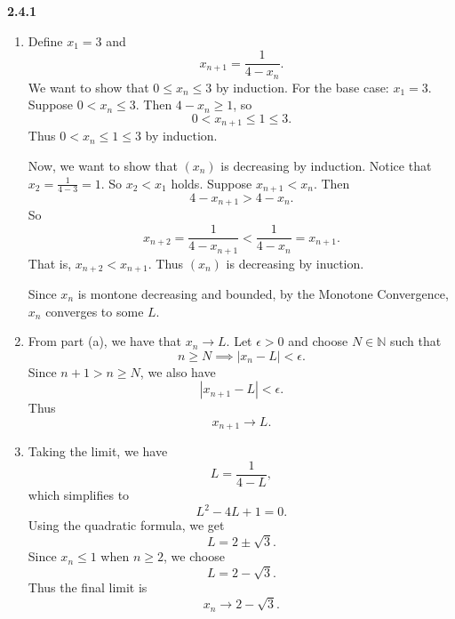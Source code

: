 \documentclass[12pt]{article}
\begin{document}
\textbf{2.4.1}
\begin{enumerate}[label=(\alph*)]
    \item Define \( x_1 = 3 \) and
          \[
              x_{n+1} = \frac{1}{4-x_n}.
          \]
          We want to show that \( 0 \leq x_n \leq 3 \) by induction.
          For the base case: \( x_1 = 3 \). Suppose \( 0 < x_n \leq 3 \).
          Then \( 4 - x_n \geq 1 \), so
          \[
              0 < x_{n+1} \leq 1 \leq 3.
          \]
          Thus \( 0 < x_n \leq 1 \leq 3 \) by induction.

          Now, we want to show that \( (x_n) \) is decreasing by induction.
          Notice that \( x_2 = \frac{1}{4-3} = 1 \).
          So \( x_2 < x_1 \) holds.
          Suppose \( x_{n+1} < x_n \). Then
          \[
              4 - x_{n+1} > 4 - x_n.
          \]
          So
          \[
              x_{n+2} = \frac{1}{4 - x_{n+1}} < \frac{1}{4 - x_n} = x_{n+1}.
          \]
          That is, \( x_{n+2} < x_{n+1} \).
          Thus \( (x_n) \) is decreasing by inuction.

          Since \( x_n \) is montone decreasing and bounded, by the Monotone Convergence, \( x_n \) converges to some \( L \).

    \item From part (a), we have that \( x_n \to L \).
          Let \( \epsilon > 0  \) and choose \( N \in \mathbb{N} \) such that
          \[
              n \geq N \implies \vert x_n - L \vert < \epsilon.
          \]
          Since \( n + 1 > n \geq N \), we also have
          \[
              |x_{n+1} - L | < \epsilon.
          \]
          Thus
          \[
              x_{n+1} \to L.
          \]
    \item Taking the limit, we have
          \[
              L = \frac{1}{4 - L},
          \]
          which simplifies to
          \[
              L^2 - 4L + 1 = 0.
          \]
          Using the quadratic formula, we get
          \[
              L = 2 \pm \sqrt{3}.
          \]
          Since \( x_n \leq 1 \) when \( n \geq 2 \), we choose
          \[
              L = 2 - \sqrt{3}.
          \]
          Thus the final limit is
          \[
              x_n \to 2 - \sqrt{3}.
          \]
\end{enumerate}
\end{document}
